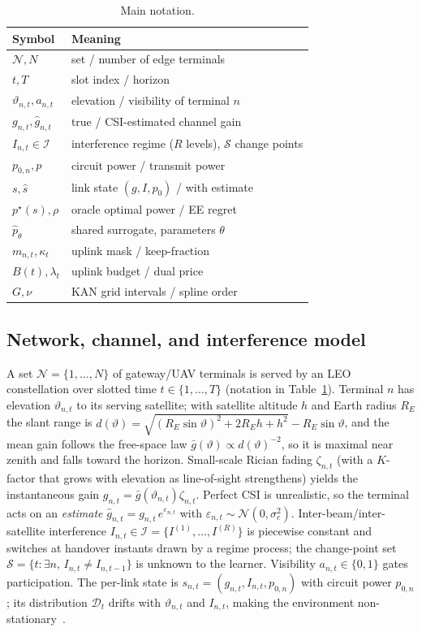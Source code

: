\documentclass[journal]{IEEEtran}
\newcommand{\pstar}{p^{\star}}
\begin{document}
\begin{table}[t]
\caption{Main notation.}
\label{tab:notation}
\centering
\footnotesize
\begin{tabular}{ll}
\toprule
Symbol & Meaning \\
\midrule
$\mathcal N,N$ & set / number of edge terminals \\
$t,T$ & slot index / horizon \\
$\vartheta_{n,t},a_{n,t}$ & elevation / visibility of terminal $n$ \\
$g_{n,t},\hat g_{n,t}$ & true / CSI-estimated channel gain \\
$I_{n,t}\!\in\!\mathcal I$ & interference regime ($R$ levels), $\mathcal S$ change points \\
$p_{0,n},p$ & circuit power / transmit power \\
$s,\hat s$ & link state $(g,I,p_0)$ / with estimate \\
$\pstar(s),\rho$ & oracle optimal power / EE regret \\
$\hat p_\theta$ & shared surrogate, parameters $\theta$ \\
$m_{n,t},\kappa_t$ & uplink mask / keep-fraction \\
$B(t),\lambda_t$ & uplink budget / dual price \\
$G,\nu$ & KAN grid intervals / spline order \\
\bottomrule
\end{tabular}
\end{table}

\subsection{Network, channel, and interference model}
A set $\mathcal{N}=\{1,\dots,N\}$ of gateway/UAV terminals is served by an LEO
constellation over slotted time $t\in\{1,\dots,T\}$ (notation in
Table~\ref{tab:notation}). Terminal $n$ has elevation $\vartheta_{n,t}$ to its
serving satellite; with satellite altitude $h$ and Earth radius $R_E$ the
slant range is
$d(\vartheta)=\sqrt{(R_E\sin\vartheta)^2+2R_Eh+h^2}-R_E\sin\vartheta$, and the mean
gain follows the free-space law $\bar g(\vartheta)\propto d(\vartheta)^{-2}$, so it
is maximal near zenith and falls toward the horizon. Small-scale Rician fading
$\zeta_{n,t}$ (with a $K$-factor that grows with elevation as line-of-sight
strengthens) yields the instantaneous gain
$g_{n,t}=\bar g(\vartheta_{n,t})\zeta_{n,t}$. Perfect CSI is unrealistic, so the
terminal acts on an \emph{estimate} $\hat g_{n,t}=g_{n,t}\,e^{\varepsilon_{n,t}}$
with $\varepsilon_{n,t}\sim\mathcal N(0,\sigma_c^2)$. Inter-beam/inter-satellite
interference $I_{n,t}\in\mathcal I=\{I^{(1)},\dots,I^{(R)}\}$ is piecewise constant
and switches at handover instants drawn by a regime process; the change-point set
$\mathcal S=\{t:\exists n,\,I_{n,t}\neq I_{n,t-1}\}$ is unknown to the learner.
Visibility $a_{n,t}\in\{0,1\}$ gates participation. The per-link state is
$s_{n,t}=(g_{n,t},I_{n,t},p_{0,n})$ with circuit power $p_{0,n}$; its distribution
$\mathcal D_t$ drifts with $\vartheta_{n,t}$ and $I_{n,t}$, making the environment
non-stationary~\cite{kodheli2021ntn,gama2014drift}.
\end{document}
